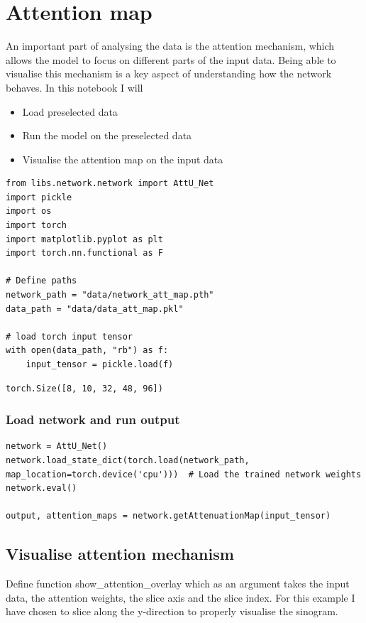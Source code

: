 \section{Attention map}

An important part of analysing the data is the attention mechanism, which allows the model to focus on different parts of the input data. Being able to visualise this mechanism is a key aspect of understanding how the network behaves. In this notebook I will

\begin{itemize}
\item Load preselected data
\item Run the model on the preselected data
\item Visualise the attention map on the input data
\end{itemize}

\begin{verbatim}
from libs.network.network import AttU_Net
import pickle
import os
import torch
import matplotlib.pyplot as plt
import torch.nn.functional as F

# Define paths
network_path = "data/network_att_map.pth"
data_path = "data/data_att_map.pkl"

# load torch input tensor
with open(data_path, "rb") as f:
    input_tensor = pickle.load(f)
\end{verbatim}

\begin{verbatim}
torch.Size([8, 10, 32, 48, 96])
\end{verbatim}

\subsubsection{Load network and run output}

\begin{verbatim}
network = AttU_Net()
network.load_state_dict(torch.load(network_path, map_location=torch.device('cpu')))  # Load the trained network weights
network.eval()

output, attention_maps = network.getAttenuationMap(input_tensor)
\end{verbatim}

\subsection{Visualise attention mechanism}

Define function show\_attention\_overlay which as an argument takes the input data, the attention weights, the slice axis and the slice index.
For this example I have chosen to slice along the y-direction to properly visualise the sinogram.

